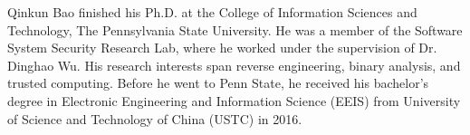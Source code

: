 
Qinkun Bao finished his Ph.D. at the College of Information Sciences
and Technology, The Pennsylvania State University. He was a member of the Software 
System Security Research Lab, where he worked under the supervision of Dr. Dinghao Wu.
His research interests span reverse engineering, binary analysis, and trusted computing. Before he went to Penn State, he received his bachelor's degree in Electronic Engineering and Information Science (EEIS) from University of Science and Technology of China (USTC) in 2016.


 